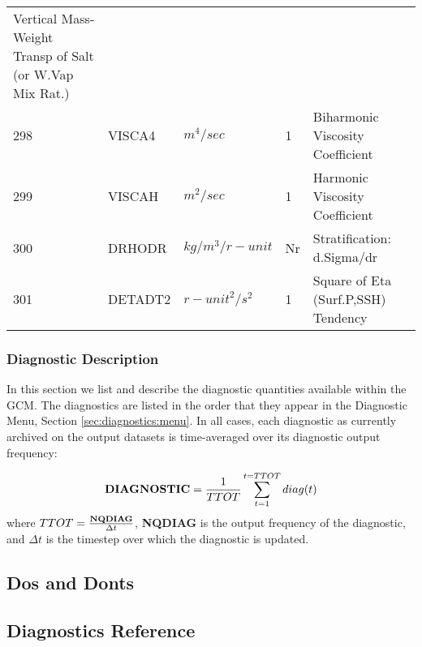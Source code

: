 \begin{tabular}{lllll}
\begin{minipage}[t]{3in}
          {Vertical Mass-Weight Transp of Salt (or W.Vap Mix Rat.)} 
         \end{minipage}\\
298& VISCA4   & $m^4/sec$ & 1
         &\begin{minipage}[t]{3in}
          {Biharmonic Viscosity Coefficient} 
         \end{minipage}\\
299& VISCAH   & $m^2/sec$ & 1
         &\begin{minipage}[t]{3in}
          {Harmonic Viscosity Coefficient} 
         \end{minipage}\\
300& DRHODR   & $kg/m^3/{r-unit}$ & Nr
         &\begin{minipage}[t]{3in}
          {Stratification: d.Sigma/dr} 
         \end{minipage}\\
301& DETADT2  & ${r-unit}^2/s^2$ & 1
         &\begin{minipage}[t]{3in}
          {Square of Eta (Surf.P,SSH) Tendency} 
         \end{minipage}\\
\end{tabular}
\vspace{1.5in}
\vfill

\newpage

\subsubsection{Diagnostic Description}

In this section we list and describe the diagnostic quantities available within the 
GCM.  The diagnostics are listed in the order that they appear in the 
Diagnostic Menu, Section \ref{sec:diagnostics:menu}.
In all cases, each diagnostic as currently archived on the output datasets
is time-averaged over its diagnostic output frequency:

\[
{\bf DIAGNOSTIC} = {1 \over TTOT} \sum_{t=1}^{t=TTOT} diag(t)
\]
where $TTOT = {{\bf NQDIAG} \over \Delta t}$, {\bf NQDIAG} is the 
output frequency of the diagnostic, and $\Delta t$ is
the timestep over which the diagnostic is updated.  

\subsection{Dos and Donts}

\subsection{Diagnostics Reference}

